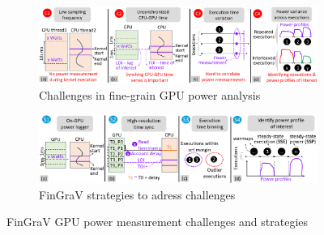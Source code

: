 \begin{figure}[H]
    \centering
    \begin{subfigure}{1\textwidth}
        \includegraphics[width=1\textwidth]{Figures/fingrav_challenges.png}
        \caption[Challenges in fine-grain GPU power analysis]{Challenges in fine-grain GPU power analysis}
        \label{fig:fingrav_challenges}
    \end{subfigure}
    \hfill
    \begin{subfigure}{1\textwidth}
        \includegraphics[width=1\textwidth]{Figures/fingrav_solutions.png}
        \caption[FinGraV strategies to adress challenges]{FinGraV strategies to adress challenges}
        \label{fig:fingrav_solutions}
    \end{subfigure}
    \caption[FinGraV GPU power measurement challenges and strategies]{FinGraV GPU power measurement challenges and strategies\parencite{singhania2024methodology}}
    \label{fig:fingrav_challenges_solutions}
\end{figure}

